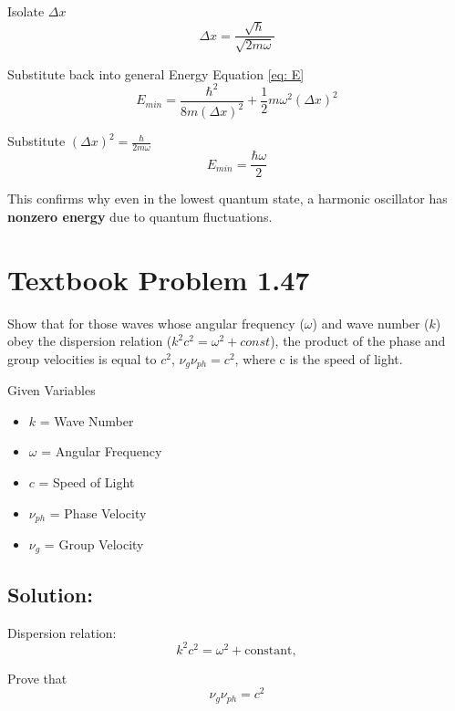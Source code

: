 \documentclass[12pt]{article}
\begin{document}
        Isolate $\Delta x$
        \begin{equation}
            \Delta x = \frac{\sqrt{\hbar}}{\sqrt{2 m \omega}}
        \end{equation}

        Substitute back into general Energy Equation \ref{eq: E}
        \begin{equation}
            E_{min} = \frac{\hbar^2}{8 m (\Delta x)^2} + \frac{1}{2} m \omega^2 (\Delta x)^2
        \end{equation}

        Substitute $(\Delta x)^2 = \frac{\hbar}{2 m \omega}$
        \begin{equation}
            E_{min} = \frac{\hbar \omega}{2}
        \end{equation}
        
        This confirms why even in the lowest quantum state, a harmonic oscillator has \textbf{nonzero energy} due to quantum fluctuations.

\section*{Textbook Problem 1.47}
    Show that for those waves whose angular frequency ($\omega$) and wave number ($k$) obey the dispersion relation ($k^2c^2 = \omega^2 + const$), the product of the phase and group velocities is equal to $c^2$, $\nu_g \nu_{ph} = c^2$, where c is the speed of light.

    Given Variables
    \begin{itemize}
        \item $k$ = Wave Number
        \item $\omega$ = Angular Frequency
        \item $c$ = Speed of Light
        \item $\nu_{ph}$ = Phase Velocity
        \item $\nu_g$ = Group Velocity
        
    \end{itemize}
    \subsection*{Solution:} 
        Dispersion relation:
        \begin{equation}
            k^2 c^2 = \omega^2 + \text{constant},
        \end{equation}

        Prove that
        \begin{equation}
            \nu_g \nu_{ph} = c^2
        \end{equation}
\end{document}
